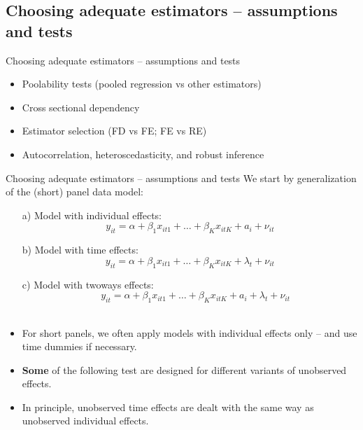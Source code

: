 \documentclass[usenames,dvipsnames]{beamer}
\begin{document}
\subsection*{Choosing adequate estimators -- assumptions and tests}
\begin{frame}{Choosing adequate estimators -- assumptions and tests}
\begin{itemize}
    \item Poolability tests (pooled regression vs other estimators)
    \medskip
    \item Cross sectional dependency
    \medskip
    \item Estimator selection (FD vs FE;  FE vs RE)
    \medskip 
    \item Autocorrelation, heteroscedasticity, and robust inference
\end{itemize}
\end{frame}
\begin{frame}{Choosing adequate estimators -- assumptions and tests}
We start by generalization of the (short) panel data model:
\begin{itemize}
   \medskip
    \item[a)] Model with individual effects: 
    $$y_{it} = \alpha + \beta_{1} x_{it1} + \dots + \beta_K x_{itK} + a_i + \nu_{it}$$
    \item[b)] Model with time effects: 
    $$y_{it} = \alpha + \beta_{1} x_{it1} + \dots + \beta_K x_{itK} + \lambda_t + \nu_{it}$$  
    \item[c)] Model with twoways effects: 
    $$~~~~~y_{it} = \alpha + \beta_{1} x_{it1} + \dots + \beta_K x_{itK} + a_i + \lambda_t + \nu_{it}$$\\ \medskip
    \item For short panels, we often apply models with individual effects only -- and use time dummies if necessary.
    \item \textbf{Some} of the following test are designed for different variants of unobserved effects.
    \item In principle, unobserved time effects are dealt with the same way as unobserved individual effects.
\end{itemize}
\end{frame}
\end{document}
